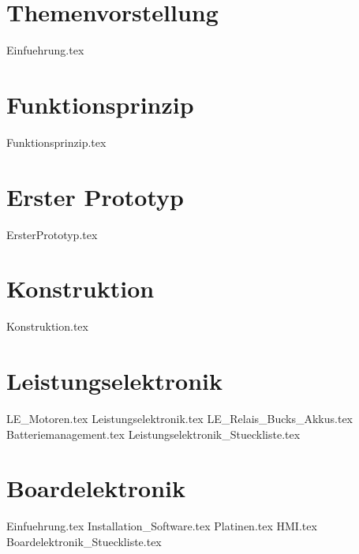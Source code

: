 \documentclass[paper=a4,12pt]{scrreprt}
\begin{document}
\mainmatter
\chapter{Themenvorstellung}
{Einfuehrung.tex}

\chapter{Funktionsprinzip}
{Funktionsprinzip.tex}


\chapter{Erster Prototyp}
{ErsterPrototyp.tex}

\chapter{Konstruktion}
{Konstruktion.tex}

\chapter{Leistungselektronik}
{LE_Motoren.tex}
{Leistungselektronik.tex}
{LE_Relais_Bucks_Akkus.tex}
{Batteriemanagement.tex}
{Leistungselektronik_Stueckliste.tex}

\chapter{Boardelektronik\label{sec:Boardelektronik}}
{Einfuehrung.tex}
{Installation_Software.tex}
{Platinen.tex}
{HMI.tex}
{Boardelektronik_Stueckliste.tex}
\end{document}
